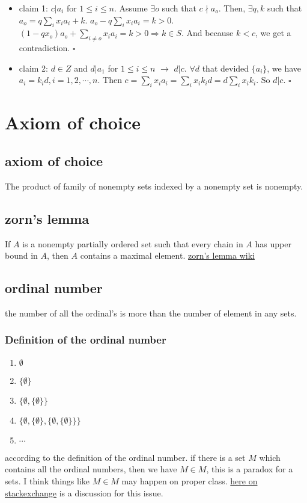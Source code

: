 \documentclass[11pt]{article}
\begin{document}
\begin{itemize}
\item claim 1: \(c | a_i\) for \(1 \leq i \leq n\).
Assume \(\exists o\) such that \(c\nmid a_o\).
Then, \(\exists q, k\) such that \(a_o = q\sum_{i}x_ia_i + k\).
\(a_o - q\sum_{i}x_ia_i = k > 0\).
\((1-qx_o)a_o + \sum_{i\not=o}x_ia_i = k > 0 \Rightarrow k\in S\).
And because \(k < c\), we get a contradiction. \(\square\)
\item claim 2: \(d\in Z\) and \(d|a_1\) for \(1\leq i\leq n\) \(\to\) \(d|c\).
\(\forall d\) that devided \(\{a_i\}\), we have \(a_i = k_id, i = 1, 2, \cdots, n\).
Then \(c = \sum_{i}x_ia_i = \sum_{i}x_ik_id = d\sum_{i}x_ik_i\).
So \(d | c\). \(\square\)
\end{itemize}
\section{Axiom of choice}
\label{sec:org3779445}
\subsection{axiom of choice}
\label{sec:org03423da}
The product of family of nonempty sets indexed by a nonempty set is nonempty.
\subsection{zorn's lemma}
\label{sec:orgf5dc881}
If \(A\) is a nonempty partially ordered set such that every chain in \(A\) has
upper bound in \(A\), then \(A\) contains a maximal element.
\href{https://en.wikipedia.org/wiki/Zorn\%27s\_lemma}{zorn's lemma wiki}
\subsection{ordinal number}
\label{sec:org0365ea9}
the number of all the ordinal's is more than the number of element in any sets.
\subsubsection{Definition of the ordinal number}
\label{sec:org414d741}
\begin{enumerate}
\item \(\emptyset\)
\item \(\{\emptyset\}\)
\item \(\{\emptyset, \{\emptyset\}\}\)
\item \(\{\emptyset, \{\emptyset\}, \{\emptyset, \{\emptyset\}\}\}\)
\item \(\cdots\)
\end{enumerate}
according to the definition of the ordinal number.
if there is a set \(M\) which contains all the ordinal numbers,
then we have \(M\in M\), this is a paradox for a sets.
I think things like \(M\in M\) may happen on proper class.
\href{https://math.stackexchange.com/questions/1046863/how-can-a-set-contain-itself}{here on stackexchange} is a discussion for this issue.
\end{document}
